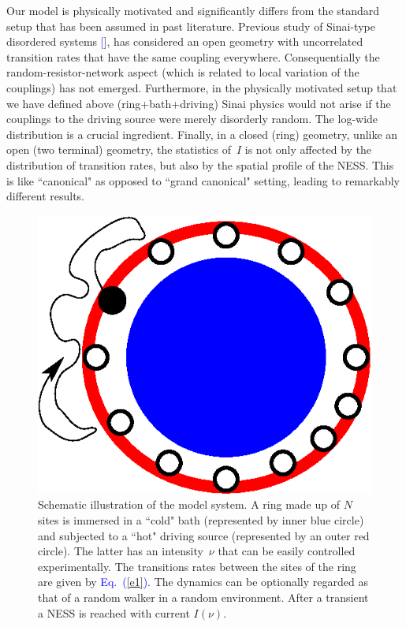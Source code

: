 \documentclass[aps,pre,floats,floatfix,twocolumn]{revtex4}
\newcommand{\Eq}[1]{\textcolor{blue}{Eq.\!\!~(\ref{#1})}}
\newcommand{\rmrk}[1]{{#1}}    %
\renewcommand{\cite}[1]{\textcolor{blue}{[\onlinecite{#1}}]} %
\begin{document}

Our model is physically motivated and significantly differs 
from the standard setup that has been assumed in past literature. 
Previous study of Sinai-type disordered systems \cite{sinai2}, 
has considered an open geometry with uncorrelated transition rates 
that have the same coupling everywhere. Consequentially 
the random-resistor-network aspect (which is related to local 
variation of the couplings) has not emerged.
%
Furthermore, in the physically motivated setup that we have 
defined above (ring+bath+driving) Sinai physics would not arise 
if the couplings to the driving source were merely disorderly random. 
The log-wide distribution is a crucial ingredient. 
%
Finally, in a closed (ring) geometry, unlike an open (two terminal) geometry, 
the statistics of~$I$ is not only affected by the distribution of transition rates, 
but also by the spatial profile of the NESS. 
This is like ``canonical" as opposed to ``grand canonical" setting, 
leading to remarkably different results.
 



\begin{figure}
\centering
\includegraphics[width=0.5\hsize]{nerRingModel}
\caption{
%
Schematic illustration of the model system.
%
A ring made up of $N$ sites is immersed in a ``cold" bath 
(represented by inner blue circle) 
and subjected to a ``hot" driving source
(represented by an outer red circle).
The latter has an intensity~$\nu$ 
that can be easily controlled experimentally. 
% 
\rmrk{The transitions rates between the sites 
of the ring are given by \Eq{e1}.  
The dynamics can be optionally regarded 
as that of a random walker in a random environment.} 
%
After a transient a NESS is reached with current $I(\nu)$.   
} 
\label{f0}
\end{figure}
\end{document}
